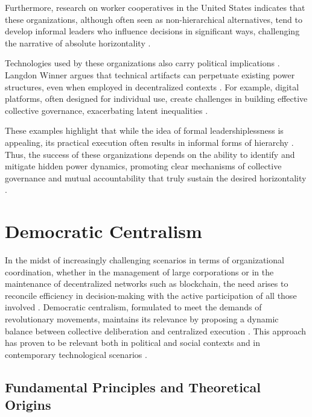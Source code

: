 Furthermore, research on worker cooperatives in the United States indicates that
these organizations, although often seen as non-hierarchical alternatives, tend
to develop informal leaders who influence decisions in significant ways,
challenging the narrative of absolute horizontality
\cite{WorkerCooperativesandRevolution}.

Technologies used by these organizations also carry political implications
\cite{DoArtifactsHavePolitics, Democraciaeoscodigosinvisiveis}. Langdon Winner
argues that technical artifacts can perpetuate existing power structures, even
when employed in decentralized contexts \cite{DoArtifactsHavePolitics}. For
example, digital platforms, often designed for individual use, create challenges
in building effective collective governance, exacerbating latent inequalities
\cite{DoArtifactsHavePolitics, BigTech}.

These examples highlight that while the idea of formal leadershiplessness is
appealing, its practical execution often results in informal forms of hierarchy
\cite{EverydayRevolutions, SocialMediaTeamsAsDigitalVanguards}. Thus, the
success of these organizations depends on the ability to identify and mitigate
hidden power dynamics, promoting clear mechanisms of collective governance and
mutual accountability that truly sustain the desired horizontality
\cite{Colbac}.

\section{Democratic Centralism}
\label{sec:democratic_centralism}

In the midst of increasingly challenging scenarios in terms of organizational
coordination, whether in the management of large corporations or in the
maintenance of decentralized networks such as blockchain, the need arises to
reconcile efficiency in decision-making with the active participation of all
those involved \cite{DoArtifactsHavePolitics}. Democratic centralism, formulated
to meet the demands of revolutionary movements, maintains its relevance by
proposing a dynamic balance between collective deliberation and centralized
execution \cite{EstatutosDoPCP}. This approach has proven to be relevant both in
political and social contexts and in contemporary technological scenarios
\cite{Colbac}.

\subsection{Fundamental Principles and Theoretical Origins}
\label{subsec:fundamental_principles_origins}


